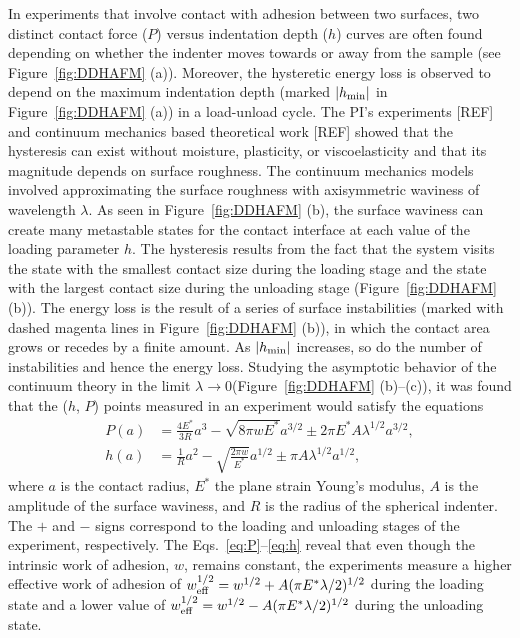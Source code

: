 \documentclass[10pt,letterpaper]{article}
\begin{document}
In experiments that involve contact with adhesion between two surfaces, two distinct contact force ($P$) versus indentation depth ($h$) curves are often found depending on whether the indenter moves towards or away from the sample (see Figure~\ref{fig:DDHAFM} (a)). 
%
Moreover, the hysteretic energy loss is observed to depend on the maximum indentation depth (marked $|h_{\rm min}|$ in Figure~\ref{fig:DDHAFM} (a)) in a load-unload cycle.
%
The PI's experiments [REF] and continuum mechanics based theoretical work [REF] showed that the hysteresis can exist without moisture, plasticity, or viscoelasticity and that its magnitude depends on surface roughness. 
%
The continuum mechanics models involved approximating the surface roughness with axisymmetric waviness of wavelength $\lambda$. 
%
As seen in Figure~\ref{fig:DDHAFM} (b), the surface waviness can create many metastable states for the contact interface at each value of the loading parameter $h$. 
%
The hysteresis results from the fact that the system visits the state with the smallest contact size during the loading stage and the state with the largest contact size during the unloading stage (Figure~\ref{fig:DDHAFM} (b)). 
%
The energy loss is the result of a series of surface instabilities (marked with dashed magenta lines in Figure~\ref{fig:DDHAFM} (b)), in which the contact area grows or recedes by a finite amount. 
%
As $|h_{\rm min}|$ increases, so do the number of instabilities and hence the energy loss.
%
Studying the asymptotic behavior of the continuum theory in the limit $\lambda \to 0$(Figure~\ref{fig:DDHAFM} (b)--(c)), it was found that the ($h$, $P$) points measured in an experiment would satisfy the equations
%
\begin{subequations}
\label{eq:P-h}
\begin{align}
	P(a) &= \frac{4E^*}{3R}a^3 - \sqrt{8\pi w E^*} a^{3/2} \pm 2\pi E^* A \lambda^{1/2} a^{3/2}, \label{eq:P}\\
	h(a) &= \frac{1}{R}a^2 - \sqrt{\frac{2\pi w}{E^*}}a^{1/2} \pm \pi A \lambda^{1/2} a^{1/2}, \label{eq:h}
\end{align}
\end{subequations}
%
where $a$ is the contact radius, $E^*$ the plane strain Young's modulus, $A$ is the amplitude of the surface
waviness, and $R$ is the radius of the spherical indenter. 
%
The $+$ and $-$ signs correspond to the loading and unloading stages of the experiment, respectively. 
%
The Eqs.~\eqref{eq:P}--\eqref{eq:h} reveal that even though the intrinsic work of adhesion, $w$, remains constant, the experiments measure a higher effective work of adhesion of $w_{\rm eff}^{1/2} = w^{1/2} + A(\pi E^* \lambda/2)^{1/2}$ during the loading state and a lower value of $w_{\rm eff}^{1/2} = w^{1/2} - A(\pi E^* \lambda/2)^{1/2}$ during the unloading state. 
\end{document}
